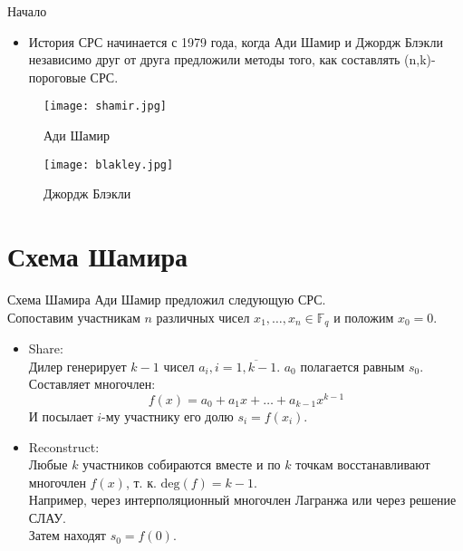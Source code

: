 \documentclass{beamer}
\begin{document}
\begin{frame}{Начало}
    \begin{itemize}
        \item История СРС начинается с 1979 года, когда Ади Шамир и Джордж Блэкли независимо друг от друга предложили методы того, как составлять (n,k)-пороговые СРС.
    \end{itemize}
    \begin{figure}
    \begin{minipage}{.5\textwidth}
        \centering
        \texttt{[image: shamir.jpg]}
        \caption{Ади Шамир}
    \end{minipage}%
    \begin{minipage}{.5\textwidth}
        \centering
        \texttt{[image: blakley.jpg]}
        \caption{Джордж Блэкли}
    \end{minipage}
    \end{figure}
    
\end{frame}

\section{Схема Шамира}
\begin{frame}{Схема Шамира}
    Ади Шамир предложил следующую СРС. \\
    Сопоставим участникам \(n\) различных чисел \(x_1, \dots, x_n \in \mathbb{F}_q\) и положим \(x_0 = 0\).
    \begin{itemize}
        \item Share: \\
        Дилер генерирует \(k - 1\) чисел \(a_i, i = \overline{1, k - 1}\). \(a_0\) полагается равным \(s_0\). Составляет многочлен:
        \[
        f(x) = a_0 + a_1x + \dots + a_{k - 1}x^{k - 1}
        \]
        И посылает \(i\)-му участнику его долю \(s_i = f(x_i)\).
        \item Reconstruct: \\
        Любые \(k\) участников собираются вместе и по \(k\) точкам восстанавливают многочлен \(f(x)\), т. к. \(\text{deg}(f) = k - 1\). \\Например, через интерполяционный многочлен Лагранжа или через решение СЛАУ. \\
        Затем находят \(s_0 = f(0)\).
        
    \end{itemize}
\end{frame}
\end{document}
